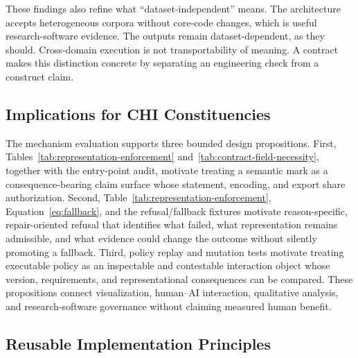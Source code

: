 \documentclass[manuscript,screen,review,anonymous]{acmart}
\begin{document}
These findings also refine what ``dataset-independent'' means. The architecture accepts heterogeneous corpora without core-code changes, which is useful research-software evidence. The outputs remain dataset-dependent, as they should. Cross-domain execution is not transportability of meaning. A contract makes this distinction concrete by separating an engineering check from a construct claim.

\subsection{Implications for CHI Constituencies}

The mechanism evaluation supports three bounded design propositions. First, Tables~\ref{tab:representation-enforcement} and~\ref{tab:contract-field-necessity}, together with the entry-point audit, motivate treating a semantic mark as a consequence-bearing claim surface whose statement, encoding, and export share authorization. Second, Table~\ref{tab:representation-enforcement}, Equation~\ref{eq:fallback}, and the refusal/fallback fixtures motivate reason-specific, repair-oriented refusal that identifies what failed, what representation remains admissible, and what evidence could change the outcome without silently promoting a fallback. Third, policy replay and mutation tests motivate treating executable policy as an inspectable and contestable interaction object whose version, requirements, and representational consequences can be compared. These propositions connect visualization, human--AI interaction, qualitative analysis, and research-software governance without claiming measured human benefit.

\subsection{Reusable Implementation Principles}
\end{document}

